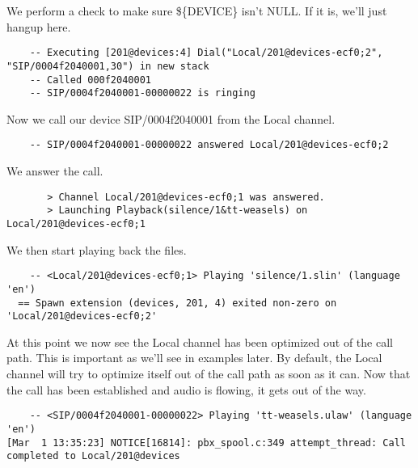 We perform a check to make sure \$\{DEVICE\} isn't NULL. If it is, we'll just
hangup here.

\begin{astlisting}
\begin{verbatim}
    -- Executing [201@devices:4] Dial("Local/201@devices-ecf0;2", "SIP/0004f2040001,30") in new stack
    -- Called 000f2040001
    -- SIP/0004f2040001-00000022 is ringing
\end{verbatim}
\end{astlisting}

Now we call our device SIP/0004f2040001 from the Local channel.

\begin{verbatim}
    -- SIP/0004f2040001-00000022 answered Local/201@devices-ecf0;2
\end{verbatim}

We answer the call.

\begin{astlisting}
\begin{verbatim}
       > Channel Local/201@devices-ecf0;1 was answered.
       > Launching Playback(silence/1&tt-weasels) on Local/201@devices-ecf0;1
\end{verbatim}
\end{astlisting}

We then start playing back the files.

\begin{astlisting}
\begin{verbatim}
    -- <Local/201@devices-ecf0;1> Playing 'silence/1.slin' (language 'en')
  == Spawn extension (devices, 201, 4) exited non-zero on 'Local/201@devices-ecf0;2'
\end{verbatim}
\end{astlisting}

At this point we now see the Local channel has been optimized out of the call
path. This is important as we'll see in examples later. By default, the Local
channel will try to optimize itself out of the call path as soon as it can. Now
that the call has been established and audio is flowing, it gets out of the way.

\begin{astlisting}
\begin{verbatim}
    -- <SIP/0004f2040001-00000022> Playing 'tt-weasels.ulaw' (language 'en')
[Mar  1 13:35:23] NOTICE[16814]: pbx_spool.c:349 attempt_thread: Call completed to Local/201@devices
\end{verbatim}
\end{astlisting}

